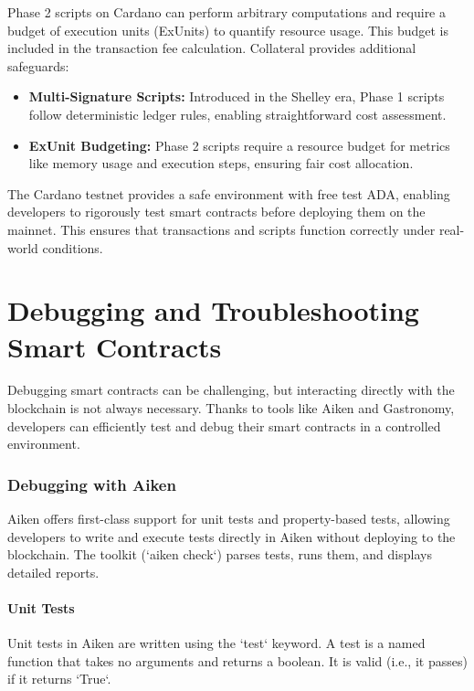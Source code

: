 Phase 2 scripts on Cardano can perform arbitrary computations and require a budget of execution units (ExUnits) to quantify resource usage. This budget is included in the transaction fee calculation. Collateral provides additional safeguards:

\begin{itemize}
    \item \textbf{Multi-Signature Scripts:} Introduced in the Shelley era, Phase 1 scripts follow deterministic ledger rules, enabling straightforward cost assessment.
    \item \textbf{ExUnit Budgeting:} Phase 2 scripts require a resource budget for metrics like memory usage and execution steps, ensuring fair cost allocation.
\end{itemize}

The Cardano testnet provides a safe environment with free test ADA, enabling developers to rigorously test smart contracts before deploying them on the mainnet. This ensures that transactions and scripts function correctly under real-world conditions.


\section{Debugging and Troubleshooting Smart Contracts}

Debugging smart contracts can be challenging, but interacting directly with the blockchain is not always necessary. Thanks to tools like Aiken and Gastronomy, developers can efficiently test and debug their smart contracts in a controlled environment.

\subsubsection{Debugging with Aiken}

Aiken offers first-class support for unit tests and property-based tests, allowing developers to write and execute tests directly in Aiken without deploying to the blockchain. The toolkit (`aiken check`) parses tests, runs them, and displays detailed reports.

\paragraph{Unit Tests}

Unit tests in Aiken are written using the `test` keyword. A test is a named function that takes no arguments and returns a boolean. It is valid (i.e., it passes) if it returns `True`.

